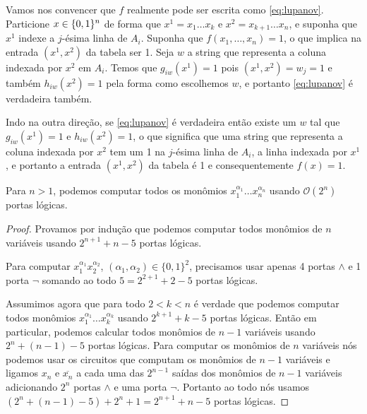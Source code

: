 Vamos nos convencer que $f$ realmente pode ser escrita como \ref{eq:lupanov}. Particione $x \in \{0, 1\}^{n}$ de forma que $x^{1} = x_{1}\dots x_{k}$ e $x^{2} = x_{k + 1}\dots x_{n}$, e suponha que $x^{1}$ indexe a $j$-ésima linha de $A_{i}$. Suponha que $f(x_{1}, \dots, x_{n}) = 1$, o que implica na entrada $(x^{1}, x^{2})$ da tabela ser 1. Seja $w$ a string que representa a coluna indexada por $x^{2}$ em $A_{i}$. Temos que $g_{iw}(x^{1}) = 1$ pois $(x^{1}, x^{2}) = w_{j} = 1$ e também $h_{iw}(x^{2}) = 1$ pela forma como escolhemos $w$, e portanto \ref{eq:lupanov} é verdadeira também.

Indo na outra direção, se \ref{eq:lupanov} é verdadeira então existe um $w$ tal que $g_{iw}(x^{1}) = 1$ e $h_{iw}(x^{2}) = 1$, o que significa que uma string que representa a coluna indexada por $x^{2}$ tem um 1 na $j$-ésima linha de $A_{i}$, a linha indexada por $x^{1}$, e portanto a entrada $(x^{1}, x^{2})$ da tabela é 1 e consequentemente $f(x) = 1$.

\begin{lema} \label{lema:mon}

Para $n > 1$, podemos computar todos os monômios $x_{1}^{\alpha_{1}}\dots x_{n}^{\alpha_{n}}$ usando $\mathcal{O}(2^{n})$ portas lógicas.

\end{lema}

\begin{proof}

\hfill

Provamos por indução que podemos computar todos monômios de $n$ variáveis usando $2^{n + 1} + n - 5$ portas lógicas.

Para computar $x_{1}^{\alpha_{1}}x_{2}^{\alpha_{2}}$, $(\alpha_{1}, \alpha_{2}) \in \{0, 1\}^{2}$, precisamos usar apenas 4 portas $\land$ e 1 porta $\lnot$ somando ao todo $5 = 2^{2 + 1} + 2 - 5$ portas lógicas.

Assumimos agora que para todo $2 < k < n$ é verdade que podemos computar todos monômios $x_{1}^{\alpha_{1}}\dots x_{k}^{\alpha_{k}}$ usando $2^{k + 1} + k - 5$ portas lógicas. Então em particular, podemos calcular todos monômios de $n - 1$ variáveis usando $2^{n} + (n - 1) - 5$ portas lógicas. Para computar os monômios de $n$ variáveis nós podemos usar os circuitos que computam os monômios de $n - 1$ variáveis e ligamos $x_{n} \text{ e } \overline{x_{n}}$ a cada uma das $2^{n - 1}$ saídas dos monômios de $n - 1$ variáveis adicionando $2^{n}$ portas $\land$ e uma porta $\lnot$. Portanto ao todo nós usamos $(2^{n} + (n - 1) - 5) + 2^{n} + 1 = 2^{n + 1} + n - 5$ portas lógicas.

\end{proof}

